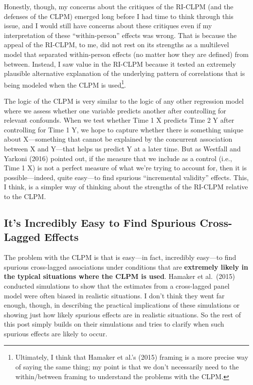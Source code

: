 \documentclass[
  english,
  man,floatsintext]{apa6}
\begin{document}
Honestly, though, my concerns about the critiques of the RI-CLPM (and the defenses of the CLPM) emerged long before I had time to think through this issue, and I would still have concerns about these critiques even if my interpretation of these ``within-person'' effects was wrong. That is because the appeal of the RI-CLPM, to me, did not rest on its strengths as a multilevel model that separated within-person effects (no matter how they are defined) from between. Instead, I saw value in the RI-CLPM because it tested an extremely plausible alternative explanation of the underlying pattern of correlations that is being modeled when the CLPM is used\footnote{Ultimately, I think that Hamaker et al.'s (2015) framing is a more precise way of saying the same thing; my point is that we don't necessarily need to the within/between framing to understand the problems with the CLPM.}.

The logic of the CLPM is very similar to the logic of any other regression model where we assess whether one variable predicts another after controlling for relevant confounds. When we test whether Time 1 X predicts Time 2 Y after controlling for Time 1 Y, we hope to capture whether there is something unique about X---something that cannot be explained by the concurrent association between X and Y---that helps us predict Y at a later time. But as Westfall and Yarkoni (2016) pointed out, if the measure that we include as a control (i.e., Time 1 X) is not a perfect measure of what we're trying to account for, then it is possible---indeed, quite easy---to find spurious ``incremental validity'' effects. This, I think, is a simpler way of thinking about the strengths of the RI-CLPM relative to the CLPM.

\hypertarget{its-incredibly-easy-to-find-spurious-cross-lagged-effects}{%
\subsection{It's Incredibly Easy to Find Spurious Cross-Lagged Effects}\label{its-incredibly-easy-to-find-spurious-cross-lagged-effects}}

The problem with the CLPM is that is easy---in fact, incredibly easy---to find spurious cross-lagged associations under conditions that are \textbf{extremely likely in the typical situations where the CLPM is used}. Hamaker et al.~(2015) conducted simulations to show that the estimates from a cross-lagged panel model were often biased in realistic situations. I don't think they went far enough, though, in describing the practical implications of these simulations or showing just how likely spurious effects are in realistic situations. So the rest of this post simply builds on their simulations and tries to clarify when such spurious effects are likely to occur.
\end{document}
